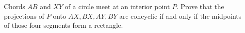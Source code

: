 Chords $AB$ and $XY$ of a circle meet at an interior point $P$. Prove that the projections of $P$ onto $AX,BX,AY,BY$ are concyclic if and only if the midpoints of those four segments form a rectangle.
